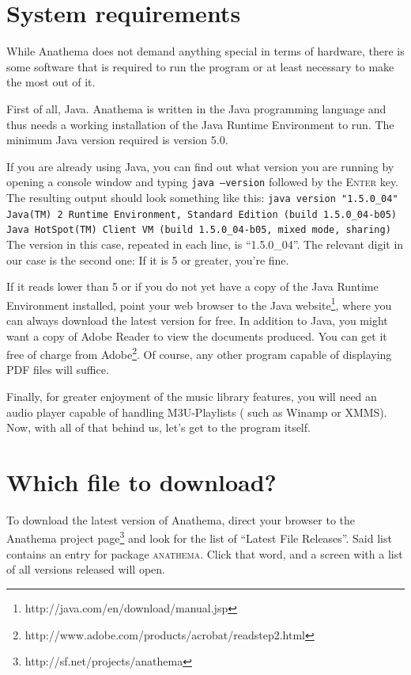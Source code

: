 \section{System requirements}
While Anathema does not demand anything special in terms of hardware, there is some software that is required to run the program or at least necessary to make the most out of it.

First of all, Java. Anathema is written in the Java programming language and thus needs a working installation of the Java Runtime Environment to run. The minimum Java version required is version 5.0.

If you are already using Java, you can find out what version you are running by opening a console window and typing \texttt{java --version} followed by the \textsc{Enter} key. The resulting output should look something like this:
\medskip
\newline
\small
\texttt{java version "1.5.0\_04"
\newline
Java(TM) 2 Runtime Environment, Standard Edition (build 1.5.0\_04-b05)
\newline
Java HotSpot(TM) Client VM (build 1.5.0\_04-b05, mixed mode, sharing)}
\medskip
\newline
\normalsize
The version in this case, repeated in each line, is ``1.5.0\_04''. The relevant digit in our case is the second one: If it is 5 or greater, you're fine.

If it reads lower than 5 or if you do not yet have a copy of the Java Runtime Environment installed, point your web browser to the Java website\footnote{http://java.com/en/download/manual.jsp}, where you can always download the latest version for free.
\medskip
\newline
In addition to Java, you might want a copy of Adobe Reader to view the documents produced. You can get it free of charge from Adobe\footnote{http://www.adobe.com/products/acrobat/readstep2.html}. Of course, any other program capable of displaying PDF files will suffice.

Finally, for greater enjoyment of the music library features, you will need an audio player capable of handling M3U-Playlists ( such as Winamp or XMMS).
\medskip
\newline
Now, with all of that behind us, let's get to the program itself.

\section{Which file to download?}
To download the latest version of Anathema, direct your browser to the Anathema project page\footnote{http://sf.net/projects/anathema} and look for the list of ``Latest File Releases''. Said list contains an entry for package \textsc{anathema}. Click that word, and a screen with a list of all versions released will open.


